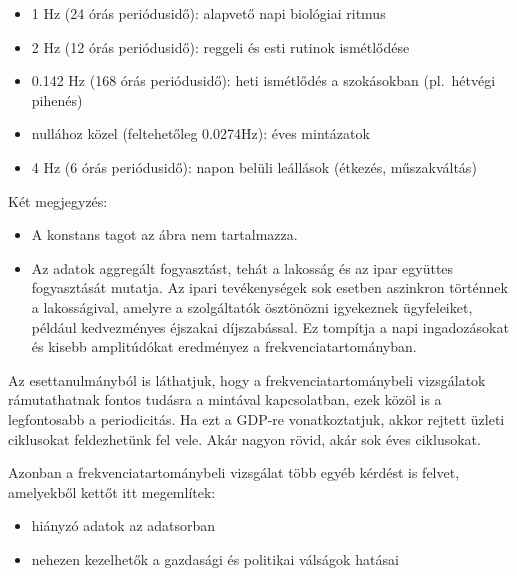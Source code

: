 \begin{itemize}
    \item 1 Hz (24 órás periódusidő): alapvető napi biológiai ritmus
    \item 2 Hz (12 órás periódusidő): reggeli és esti rutinok ismétlődése
    \item 0.142 Hz (168 órás periódusidő): heti ismétlődés a szokásokban (pl.\ hétvégi pihenés)
    \item nullához közel (feltehetőleg 0.0274Hz): éves mintázatok
    \item 4 Hz (6 órás periódusidő): napon belüli leállások (étkezés, műszakváltás)
\end{itemize}

Két megjegyzés:

\begin{itemize}
    \item A konstans tagot az ábra nem tartalmazza.
    \item Az adatok aggregált fogyasztást, tehát a lakosság és az ipar együttes fogyasztását mutatja. Az
          ipari tevékenységek sok esetben aszinkron történnek a lakosságival, amelyre a szolgáltatók
          ösztönözni igyekeznek ügyfeleiket, például kedvezményes éjszakai díjszabással. Ez tompítja a napi
          ingadozásokat és kisebb amplitúdókat eredményez a frekvenciatartományban.
\end{itemize}

Az esettanulmányból is láthatjuk, hogy a frekvenciatartománybeli vizsgálatok rámutathatnak fontos
tudásra a mintával kapcsolatban, ezek közöl is a legfontosabb a periodicitás. Ha ezt a GDP-re
vonatkoztatjuk, akkor rejtett üzleti ciklusokat feldezhetünk fel vele. Akár nagyon rövid, akár sok
éves ciklusokat.

Azonban a frekvenciatartománybeli vizsgálat több egyéb kérdést is felvet, amelyekből kettőt itt
megemlítek:

\begin{itemize}
    \item hiányzó adatok az adatsorban
    \item nehezen kezelhetők a gazdasági és politikai válságok hatásai
\end{itemize}